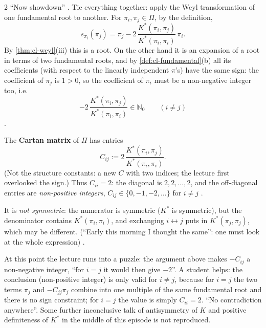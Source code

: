 \begin{paracol}{2}
``Now showdown''  . Tie everything together: apply the Weyl transformation of one fundamental root to another. For $\pi_i,\pi_j\in\Pi$, by the definition,
\[
  s_{\pi_i}(\pi_j)=\pi_j-2\,\frac{K^*(\pi_i,\pi_j)}{K^*(\pi_i,\pi_i)}\,\pi_i .
\]
By \cref{thm:cl-weyl}(iii) this is a root. On the other hand it is an expansion of a root in terms of two fundamental roots, and by \cref{def:cl-fundamental}(b) all its coefficients (with respect to the linearly independent $\pi$'s) have the same sign: the coefficient of $\pi_j$ is $1>0$, so the coefficient of $\pi_i$ must be a non-negative integer too, i.e.
\[
  -2\,\frac{K^*(\pi_i,\pi_j)}{K^*(\pi_i,\pi_i)}\in\mathbb N_0\qquad(i\neq j)
\]
          .
\begin{definition}\label{def:cl-cartan-matrix}
The \textbf{Cartan matrix} of $\Pi$ has entries
\[
  C_{ij}:=2\,\frac{K^*(\pi_i,\pi_j)}{K^*(\pi_i,\pi_i)}.
\]
(Not the structure constants: a new $C$ with two indices; the lecture first overlooked the sign.) Thus $C_{ii}=2$: the diagonal is $2,2,\dots,2$, and the off-diagonal entries are \emph{non-positive integers}, $C_{ij}\in\{0,-1,-2,\dots\}$ for $i\ne j$      .
\end{definition}
It is \emph{not symmetric}: the numerator is symmetric ($K^*$ is symmetric), but the denominator contains $K^*(\pi_i,\pi_i)$, and exchanging $i\leftrightarrow j$ puts in $K^*(\pi_j,\pi_j)$, which may be different. (``Early this morning I thought the same'': one must look at the whole expression)   .
\begin{coursenote}
At this point the lecture runs into a puzzle: the argument above makes $-C_{ij}$ a non-negative integer, ``for $i=j$ it would then give $-2$''. A student helps: the conclusion (non-positive integer) is only valid for $i\ne j$, because for $i=j$ the two terms $\pi_j$ and $-C_{jj}\pi_j$ combine into one multiple of the same fundamental root and there is no sign constraint; for $i=j$ the value is simply $C_{ii}=2$. ``No contradiction anywhere''. Some further inconclusive talk of antisymmetry of $K$ and positive definiteness of $K^*$ in the middle of this episode is not reproduced.              
\end{coursenote}


\end{paracol}
